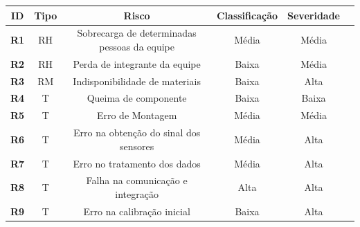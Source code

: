 \begin{table}[H]
\center
\footnotesize
\begin{tabular}{|l|l|l|l|l|l|}
\hline
\multicolumn{1}{|c|}{\textbf{ID}} & \multicolumn{1}{|c}{\textbf{Tipo}}  & \multicolumn{1}{|c}{\textbf{Risco}}  & \multicolumn{1}{|c}{\textbf{Classificação}}  & \multicolumn{1}{|c|}{\textbf{Severidade}}   \\ \hline
\multicolumn{1}{|c}{\textbf{R1}}  & \multicolumn{1}{|c}{RH} & \multicolumn{1}{|c}{Sobrecarga de determinadas pessoas da equipe}       & \multicolumn{1}{|c}{Média} & \multicolumn{1}{|c|}{Média}              \\ \hline
\multicolumn{1}{|c}{\textbf{R2}}  & \multicolumn{1}{|c}{RH} & \multicolumn{1}{|c}{Perda de integrante da equipe} & \multicolumn{1}{|c}{Baixa}    & \multicolumn{1}{|c|}{Média}             \\ \hline
\multicolumn{1}{|c}{\textbf{R3}}  & \multicolumn{1}{|c}{RM} & \multicolumn{1}{|c}{Indisponibilidade de materiais}       & \multicolumn{1}{|c}{Baixa}    & \multicolumn{1}{|c|}{Alta}          \\ \hline
\multicolumn{1}{|c}{\textbf{R4}}  & \multicolumn{1}{|c}{T} & \multicolumn{1}{|c}{Queima de componente}   & \multicolumn{1}{|c}{Baixa}                  & \multicolumn{1}{|c|}{Baixa}                      \\ \hline
\multicolumn{1}{|c}{\textbf{R5}}  & \multicolumn{1}{|c}{T} & \multicolumn{1}{|c}{Erro de Montagem} & \multicolumn{1}{|c}{Média}     & \multicolumn{1}{|c|}{Média}             \\ \hline
\multicolumn{1}{|c}{\textbf{R6}} & \multicolumn{1}{|c}{T}  & \multicolumn{1}{|c}{Erro na obtenção do sinal dos sensores}     & \multicolumn{1}{|c}{Média}                  & \multicolumn{1}{|c|}{Alta}                      \\ \hline
\multicolumn{1}{|c}{\textbf{R7}} & \multicolumn{1}{|c}{T}  & \multicolumn{1}{|c}{Erro no tratamento dos dados}      &        \multicolumn{1}{|c}{Média}     &        \multicolumn{1}{|c|}{Alta}            \\ \hline
\multicolumn{1}{|c}{\textbf{R8}} & \multicolumn{1}{|c}{T}  & \multicolumn{1}{|c}{Falha na comunicação e integração}                 &      \multicolumn{1}{|c}{Alta}      &            \multicolumn{1}{|c|}{Alta}             \\ \hline
\multicolumn{1}{|c}{\textbf{R9}} & \multicolumn{1}{|c}{T}   & \multicolumn{1}{|c}{Erro na calibração inicial}       &   \multicolumn{1}{|c}{Baixa}           &       \multicolumn{1}{|c|}{Alta}                                           \\ \hline

\end{tabular}
\end{table}
